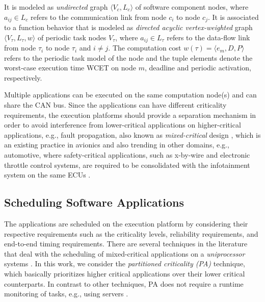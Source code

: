 \begin{definition}
It is modeled as \textit{undirected} graph $\langle V_c,L_c\rangle$ of software component nodes, where $a_{ij}\in L_c$ refers to the communication link from node $c_i$ to node $c_j$. It is associated to a function behavior that is modeled as \textit{directed acyclic vertex-weighted} graph $\langle V_\tau,L_\tau, w\rangle$ of periodic task nodes $V_\tau$, where $a_{ij}\in L_\tau$ refers to the data-flow link from node $\tau_i$ to node $\tau_i$ and $i \neq j$. The computation cost $w(\tau)=\langle e_m,D,P\rangle$ refers to the periodic task model of the node and the tuple elements denote the worst-case execution time {WCET} on node $m$, deadline and periodic activation, respectively.
\end{definition}

Multiple applications can be executed on the same computation node(s) and can share the CAN bus. Since the applications can have different criticality requirements, the execution platforms should provide a separation mechanism in order to avoid interference from lower-critical applications on higher-critical applications, e.g., fault propagation, also known as   \textit{mixed-critical} design \cite{Vestal2007PreemptiveAssurance}, which is an existing practice in avionics and also trending in other domains, e.g., automotive, where  safety-critical applications, such as x-by-wire and electronic throttle control systems, are required to be consolidated with the infotainment system on the same ECUs \cite{bibid}.

\subsection{Scheduling Software Applications}
The applications are scheduled on the execution platform by considering their respective requirements such as the criticality levels, reliability requirements, and end-to-end timing requirements. There are several techniques in the literature that deal with the scheduling of mixed-critical applications on a \textit{uniprocessor} systems \cite{Vestal2007PreemptiveAssurance}. In this work, we consider the \textit{partitioned criticality (PA)}  technique, which basically prioritizes higher critical applications over their lower critical counterparts. In contrast to other techniques, PA does not require a runtime monitoring of tasks, e.g., using servers \cite{AbeniIntegratingSystems,Ashjaei2017DesigningSystems,Inam2014ThePlatforms}.

